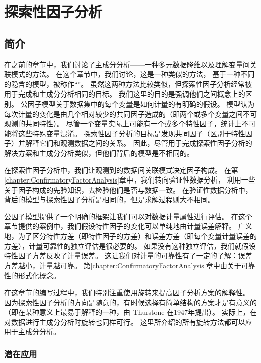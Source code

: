 \chapter{探索性因子分析}

\section{简介}

在之前的章节中，我们讨论了主成分分析——一种多元数据降维以及理解变量间关联模式的方法。
在这个章节中，我们讨论，这是一种类似的方法，
基于一种不同的隐含的模型，被称作“”。
虽然这两种方法比较类似，但探索性因子分析经常被用于完成和主成分分析相同的目标。
我们这里的目的是强调他们之间概念上的区别。
公因子模型关于数据集中的每个变量是如何计量的有明确的假设。
模型认为每次计量的变化是由几个相对较少的共同因子造成的（即两个或多个变量之间不可观测的共同特性）。
尽管一个变量实际上可能有一个或多个特性因子，统计上不可能将这些特殊变量混淆。
探索性因子分析的目标是发现共同因子（区别于特性因子）并解释它们和观测数据之间的关系。
因此，尽管用于完成探索性因子分析的解决方案和主成分分析类似，但他们背后的模型是不相同的。

在探索性因子分析中，我们让观测到的数据间关联模式决定因子构成。
在第\ref{chapter:ConfirmatoryFactorAnalysis}章中，我们转向验证性数据分析，
利用一些关于因子构成的先验知识，去检验他们是否与数据一致。
在验证性数据分析中，背后的模型与探索性因子分析是相同的，但是求解过程则大不相同。

公因子模型提供了一个明确的框架让我们可以对数据计量属性进行评估。
在这个章节提供的案例中，我们假设特性因子的变化可以单纯地由计量误差解释。
广义地，为了区分特性方差（即特性因子的方差）和误差方差（即每个变量计量误差的方差），计量可靠性的独立评估是很必要的。
如果没有这种独立评估，我们就假设特性因子方差反映了计量误差。
这让我们对计量的可靠性有了一定的了解：误差方差越小，计量越可靠。
第\ref{chapter:ConfirmatoryFactorAnalysis}章中由关于可靠性的形式化概念。

在这章节的编写过程中，我们特别注重使用旋转来提高因子分析方案的解释性。
因为探索性因子分析的方向是随意的，有时候选择有简单结构的方案才是有意义的
（即在某种意义上最易于解释的一种，由 Thurstone 在1947年提出）。
实际上，在对数据进行主成分分析时旋转也同样可行。
这里所介绍的所有旋转方法都可以应用于主成分分析。

\subsection{潜在应用}

